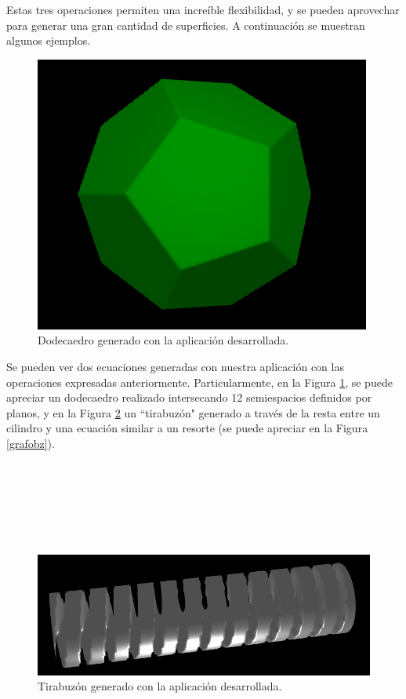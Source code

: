 \documentclass[12pt]{article}
\begin{document}
Estas tres operaciones permiten una increíble flexibilidad, y se pueden aprovechar para generar una gran cantidad de superficies. A continuación se muestran algunos ejemplos.\\
\begin{figure}
\includegraphics[width=0.9\linewidth]{dodecaedro.png} 
\caption{Dodecaedro generado con la aplicación desarrollada.}
\label{dode}
\end{figure}

Se pueden ver dos ecuaciones generadas con nuestra aplicación con las operaciones expresadas anteriormente. Particularmente, en la Figura \ref{dode}, se puede apreciar un dodecaedro realizado intersecando 12 semiespacios definidos por planos, y en la Figura \ref{tornillo} un ``tirabuzón" generado a través de la resta entre un cilindro  y una ecuación similar a un resorte (se puede apreciar en la Figura \ref{grafobz}).
\\
\\
\\
\\
\\
\\
\\

\begin{figure}[h]
\includegraphics[width=0.7\linewidth,center]{tornillo.png}
\caption{Tirabuzón generado con la aplicación desarrollada.}
\label{tornillo}
\end{figure}
\end{document}
